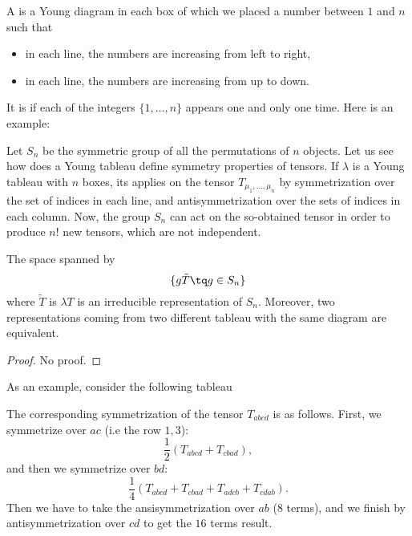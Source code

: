 \begin{center}
   
\end{center}


A  is a Young diagram in each box of which we placed a number between $1$ and $n$ such that
\begin{itemize}
	\item in each line, the numbers are increasing from left to right,
	\item in each line, the numbers are increasing from up to down.
\end{itemize}
It is  if each of the integers $\{ 1,\ldots,n \}$ appears one and only one time. Here is an example:
%	
\begin{center}
   
\end{center}
Let $S_n$ be the symmetric group of all the permutations of $n$ objects. Let us see how does a Young tableau define symmetry properties of tensors. If $\lambda$ is a Young tableau with $n$ boxes, its applies on the tensor $T_{\mu_1,\ldots,\mu_n}$ by symmetrization over the set of indices in each line, and antisymmetrization over the sets of indices in each column. Now, the group $S_n$ can act on the so-obtained tensor in order to produce $n!$ new tensors, which are not independent.

\begin{lemma}
The space spanned by
\begin{equation}
	\{ g \tilde T\tq g\in S_n \}
\end{equation}
where $\tilde T$ is $\lambda T$ is an irreducible representation of $S_n$. Moreover, two representations coming from two different tableau with the same diagram are equivalent.
\end{lemma}
\begin{proof}
	No proof.
\end{proof}
As an example, consider the following tableau
%	
\begin{center}
   
\end{center}
The corresponding symmetrization of the tensor $T_{abcd}$ is as follows. First, we symmetrize over $ac$ (i.e the row $1,3$):
\begin{equation}
\frac{ 1 }{2}(	T_{abcd}+T_{cbad}),
\end{equation}
and then we symmetrize over $bd$:
\begin{equation}
	\frac{1}{ 4 }(T_{abcd}+T_{cbad}+T_{adcb}+T_{cdab}).
\end{equation}
Then we have to take the ansisymmetrization over $ab$ ($8$ terms), and we finish by antisymmetrization over $cd$ to get the $16$ terms result.

